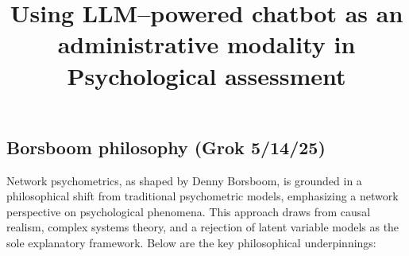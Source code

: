 \documentclass[
  jou,
  floatsintext,
  longtable,
  nolmodern,
  notxfonts,
  notimes,
  colorlinks=true,linkcolor=blue,citecolor=blue,urlcolor=blue]{apa7}
\title{Using LLM--powered chatbot as an administrative modality in
Psychological assessment}
\affiliation{
{Ana and Blanca's University}}
\begin{document}
\maketitle


\setcounter{secnumdepth}{-\maxdimen} %

\setlength\LTleft{0pt}


\subsection{Borsboom philosophy (Grok
5/14/25)}\label{borsboom-philosophy-grok-51425}

Network psychometrics, as shaped by Denny Borsboom, is grounded in a
philosophical shift from traditional psychometric models, emphasizing a
network perspective on psychological phenomena. This approach draws from
causal realism, complex systems theory, and a rejection of latent
variable models as the sole explanatory framework. Below are the key
philosophical underpinnings:
\end{document}
